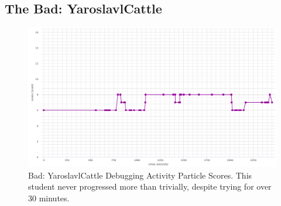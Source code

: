 \subsection{The Bad: YaroslavlCattle}
\begin{figure}
	\centering
	\includegraphics[width=\textwidth]{images/stories/scores-debug-YaroslavlCattle}
	\caption[Bad: YaroslavlCattle Debugging Activity Particle Scores]{Bad: YaroslavlCattle Debugging Activity Particle Scores. This student never progressed more than trivially, despite trying for over 30 minutes.}
	\label{fig:YaroslavlCattle_chart}
\end{figure}

